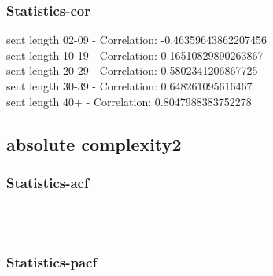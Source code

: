 \documentclass{article}%
\begin{document}
%
\newpage%
\subsubsection{Statistics{-}cor}%
\label{ssubsec:Statistics{-}cor}%
\noindent%
sent length 02-09 - Correlation: -0.46359643862207456\\%
sent length 10-19 - Correlation: 0.16510829890263867\\%
sent length 20-29 - Correlation: 0.5802341206867725\\%
sent length 30-39 - Correlation: 0.648261095616467\\%
sent length 40+ - Correlation: 0.8047988383752278\\

%
\newpage

%
\subsection{absolute complexity2}%
\label{subsec:absolutecomplexity2}%
\subsubsection{Statistics{-}acf}%
\label{ssubsec:Statistics{-}acf}%


\begin{figure}[ht]%
\centering%
\setlength{\abovecaptionskip}{-35pt}%
%
%
\\%
%
%
\\%
%
\end{figure}

%
\newpage%
\subsubsection{Statistics{-}pacf}%
\label{ssubsec:Statistics{-}pacf}%
\end{document}

